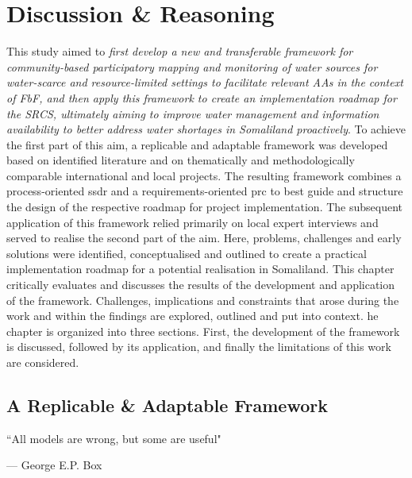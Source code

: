 \chapter{Discussion \& Reasoning}

\label{chapter5} 

This study aimed to \textit{first develop a new and transferable framework for community-based participatory mapping and monitoring of water sources for water-scarce and resource-limited settings to facilitate relevant AAs in the context of FbF, and then apply this framework to create an implementation roadmap for the SRCS, ultimately aiming to improve water management and information availability to better address water shortages in Somaliland proactively}. To achieve the first part of this aim, a replicable and adaptable framework was developed based on identified literature and on thematically and methodologically comparable international and local projects. The resulting framework combines a process-oriented \acrshort{ssdr} and a requirements-oriented \acrshort{prc} to best guide and structure the design of the respective roadmap for project implementation. The subsequent application of this framework relied primarily on local expert interviews and served to realise the second part of the aim. Here, problems, challenges and early solutions were identified, conceptualised and outlined to create a practical implementation roadmap for a potential realisation in Somaliland.\newline
This chapter critically evaluates and discusses the results of the development and application of the framework. Challenges, implications and constraints that arose during the work and within the findings are explored, outlined and put into context. he chapter is organized into three sections. First, the development of the framework is discussed, followed by its application, and finally the limitations of this work are considered.


\section{A Replicable \& Adaptable Framework}
\vspace{\baselineskip}

\epigraph{``All models are wrong, but some are useful"}{--- \textup{George E.P. Box}}

\vspace{\baselineskip}

